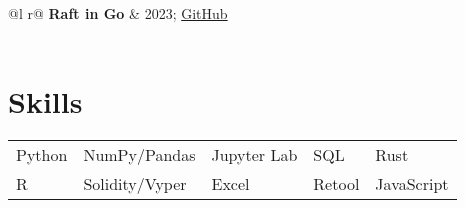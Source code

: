 \documentclass[a4paper,12pt]{article}
\begin{document}
\begin{tabularx}{\linewidth}{ @{}l r@{} }
\textbf{Raft in Go} & \hfill 2023; \href{https://github.com/cjeva10/raft}{GitHub} \\[3.75pt]
  \\
\end{tabularx}

\section{Skills}
\begin{tabularx}{\linewidth}{@{}l X@{} X@{} X@{} @{}l}
Python & NumPy/Pandas & Jupyter Lab & SQL & Rust \\
R & Solidity/Vyper & Excel & Retool & JavaScript  \\
\end{tabularx}

\vfill
{}
\end{document}
